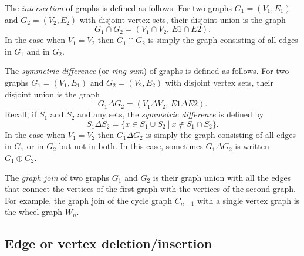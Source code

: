 The \emph{intersection} of graphs is defined as follows. For two
graphs $G_1 = (V_1, E_1)$ and $G_2 = (V_2, E_2)$ with disjoint vertex
sets, their disjoint union is the graph
\[
G_1 \cap G_2
=
(V_1 \cap V_2,\, E1 \cap E2).
\]
In the case when $V_1=V_2$ then $G_1\cap G_2$ is simply
the graph consisting of all edges in $G_1$ and in $G_2$.

The \emph{symmetric difference} (or {\it ring sum})
of graphs is defined as follows. For two
graphs $G_1 = (V_1, E_1)$ and $G_2 = (V_2, E_2)$ with disjoint vertex
sets, their disjoint union is the graph
\[
G_1 \Delta G_2
=
(V_1 \Delta V_2,\, E1 \Delta E2).
\]
Recall, if $S_1$ and $S_2$ and any sets,
the {\it symmetric difference} is defined by
\[
S_1\Delta S_2 = \{x\in S_1\cup S_2\ |\ x\notin S_1\cap S_2\}.
\]
In the case when $V_1=V_2$ then $G_1\Delta G_2$ is simply
the graph consisting of all edges in $G_1$ or in $G_2$ but not in
both. In this case, sometimes $G_1\Delta G_2$ is
written $G_1\oplus G_2$.

The \emph{graph join} of two graphs $G_1$ and $G_2$ is their graph
union with all the edges that connect the vertices of the first graph
with the vertices of the second graph. For example, the graph join of
the cycle graph $C_{n-1}$ with a single vertex graph is the wheel
graph $W_n$.

%



\subsection{Edge or vertex deletion/insertion}

